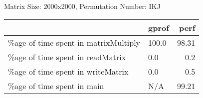 \documentclass{article}
\begin{document}
    Matrix Size: 2000x2000, Permutation Number: IKJ \\
    \begin{tabular}{llr}
\hline
                                      & gprof   &   perf \\
\hline
 \%age of time spent in matrixMultiply & 100.0   &  98.31 \\
 \%age of time spent in readMatrix     & 0.0     &   0.2  \\
 \%age of time spent in writeMatrix    & 0.0     &   0.5  \\
 \%age of time spent in main           & N/A     &  99.21 \\
\hline
\end{tabular}
    
\end{document}
